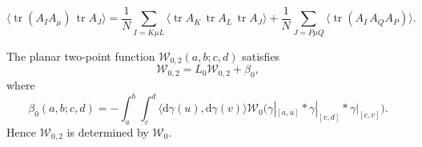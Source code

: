 \documentclass[10pt,a4paper]{amsart}
\DeclareMathOperator{\tr}{tr}
\newcommand{\cW}{\mathcal{W}}
\newcommand{\dd}{\mathrm{d}}
\begin{document}
\begin{equation}\label{eq:two-trace}
  \bigl\langle\tr(A_I A_\mu)\,\tr A_J\bigr\rangle = \frac1N\sum_{I=K\mu L}\bigl\langle\tr A_K\,\tr A_L\,\tr A_J\bigr\rangle + \frac1N\sum_{J=P\mu Q}\bigl\langle\tr(A_I\,A_Q A_P)\bigr\rangle.
\end{equation}

\begin{proposition}
\label{prop:W2-loop}
The planar two-point function $\cW_{0,2}(a,b;c,d)$ satisfies
\begin{equation}\label{eq:W2-loop}
  \cW_{0,2}=L_0\cW_{0,2}+\beta_0,
\end{equation}
where
\begin{equation}\label{eq:beta0}
\beta_0(a,b;c,d) = -\int_a^b\!\!\int_c^d \bigl\langle\dd\gamma(u),\dd\gamma(v)\bigr\rangle \cW_0\bigl( \gamma|_{[a,u]}* \gamma|_{[v,d]}* \gamma|_{[c,v]} \bigr).
\end{equation}
Hence $\cW_{0,2}$ is determined by $\cW_0$.
\end{proposition}
\end{document}
